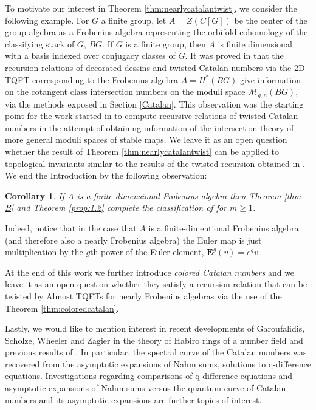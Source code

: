 \documentclass{amsart}
\newcommand{\bige}{\mathbf{E}}
\newtheorem{Cor}[Lem]{Corollary}
\theoremstyle{definition}
\begin{document}

To motivate our interest in Theorem \ref{thm:nearlycatalantwist}, we consider the following example. For $G$ a finite group, let $A=Z(C[G])$ be the center of the group algebra as a Frobenius algebra representing the orbifold cohomology of  the classifying stack of $G$, $BG$. If $G$ is a finite group, then $A$ is finite dimensional with a basis indexed over conjugacy classes of $G$. It was proved in \cite{Serrano, JK} that the recursion relations of decorated dessins and twisted Catalan numbers via the 2D TQFT corresponding to the Frobenius algebra $A=H^*(BG)$ give information on the cotangent class intersection numbers on the moduli space 
$\overline{\mathcal{M}_{g,n}}(BG)$, via the methods exposed in Section \ref{Catalan}. 
This observation was the starting point for the work started in  \cite{DM_invitation, DM_ribbon, DMSS} to compute recursive relations of twisted Catalan numbers in the attempt of obtaining information of the intersection theory of more general moduli spaces of stable maps.  We leave it as an open question whether the result of Theorem \ref{thm:nearlycatalantwist} can be applied to topological invariants similar to the results of the twisted recursion obtained in \cite{DM_invitation}. We end the Introduction  by the following observation:
\begin{Cor}
	If $A$ is a finite-dimensional Frobenius algebra then Theorem \ref{thm B} and Theorem \ref{prop:1.2} complete the classification of \cite{DM_ribbon} for $m\geq 1$. 
\end{Cor}
\noindent Indeed, notice that in the case that $A$ is a finite-dimentional Frobenius algebra (and therefore also a nearly Frobenius algebra) the Euler map is just multiplication by the $g$th power of the Euler element, $\bige^g(v)=e^gv$.

At the end of this work we further introduce {\it colored Catalan numbers} and we leave it as an open question whether they satisfy a recursion relation that can be twisted by Almost TQFTs for nearly Frobenius algebras via the use of the Theorem \ref{thm:coloredcatalan}. 


Lastly, we would like to mention interest in recent developments of Garoufalidis, Scholze, Wheeler and Zagier \cite{GSWZ} in the theory of Habiro rings of a number field and previous results of \cite{GZ}. In particular, the spectral curve of the Catalan numbers was recovered from the asymptotic expansions of Nahm sums, solutions to q-difference equations. Investigations regarding comparisons of q-difference equations and asymptotic expansions of Nahm sums versus the quantum curve of Catalan numbers and its asymptotic expansions are further topics of interest.
\end{document}
